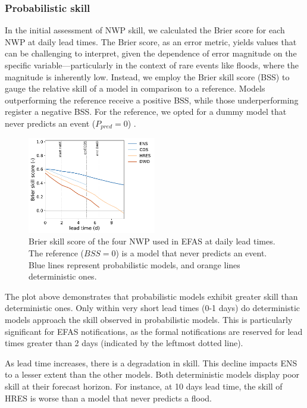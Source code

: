 \documentclass[preprint,12pt,authoryear]{elsarticle}
\begin{document}
\subsubsection{Probabilistic skill}
\label{sec:NWP_prob_skill}

In the initial assessment of NWP skill, we calculated the Brier score for each NWP at daily lead times. The Brier score, as an error metric, yields values that can be challenging to interpret, given the dependence of error magnitude on the specific variable—particularly in the context of rare events like floods, where the magnitude is inherently low. Instead, we employ the Brier skill score (BSS) to gauge the relative skill of a model in comparison to a reference. Models outperforming the reference receive a positive BSS, while those underperforming register a negative BSS. For the reference, we opted for a dummy model that never predicts an event ($P_{pred}=0$) \cite{Legg2004}.

\begin{figure}
    \centering
    \includegraphics[width=0.5\textwidth]{figures/Brier_skill_score_5.pdf}
    \caption{Brier skill score of the four NWP used in EFAS at daily lead times. The reference ($BSS=0$) is a model that never predicts an event. Blue lines represent probabilistic models, and orange lines deterministic ones.}
    \label{fig:BSS}
\end{figure}

The plot above demonstrates that probabilistic models exhibit greater skill than deterministic ones. Only within very short lead times (0-1 days) do deterministic models approach the skill observed in probabilistic models. This is particularly significant for EFAS notifications, as the formal notifications are reserved for lead times greater than 2 days (indicated by  the leftmost dotted line). 

As lead time increases, there is a degradation in skill. This decline impacts ENS to a lesser extent than the other models. Both deterministic models display poor skill at their forecast horizon. For instance, at 10 days lead time, the skill of HRES is worse than a model that never predicts a flood. 
\end{document}
